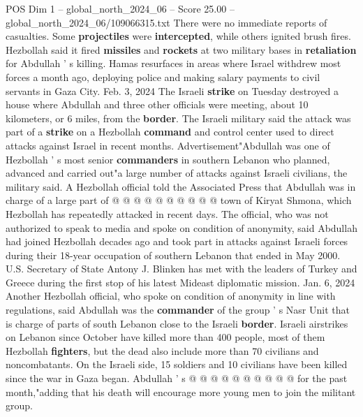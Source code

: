 \begin{textsample}{POS Dim 1 – global\_north\_2024\_06 – Score 25.00 – global\_north\_2024\_06/109066315.txt}
There were no immediate reports of casualties.
Some \textbf{projectiles} were \textbf{intercepted}, while others ignited brush fires.
Hezbollah said it fired \textbf{missiles} and \textbf{rockets} at two military bases in \textbf{retaliation} for Abdullah ' s killing.
Hamas resurfaces in areas where Israel withdrew most forces a month ago, deploying police and making salary payments to civil servants in Gaza City.
Feb. 3, 2024 The Israeli \textbf{strike} on Tuesday destroyed a house where Abdullah and three other officials were meeting, about 10 kilometers, or 6 miles, from the \textbf{border}.
The Israeli military said the attack was part of a \textbf{strike} on a Hezbollah \textbf{command} and control center used to direct attacks against Israel in recent months.
Advertisement"Abdullah was one of Hezbollah ' s most senior \textbf{commanders} in southern Lebanon who planned, advanced and carried out"a large number of attacks against Israeli civilians, the military said.
A Hezbollah official told the Associated Press that Abdullah was in charge of a large part of @ @ @ @ @ @ @ @ @ @ town of Kiryat Shmona, which Hezbollah has repeatedly attacked in recent days.
The official, who was not authorized to speak to media and spoke on condition of anonymity, said Abdullah had joined Hezbollah decades ago and took part in attacks against Israeli forces during their 18-year occupation of southern Lebanon that ended in May 2000.
U.S.
Secretary of State Antony J.
Blinken has met with the leaders of Turkey and Greece during the first stop of his latest Mideast diplomatic mission.
Jan. 6, 2024 Another Hezbollah official, who spoke on condition of anonymity in line with regulations, said Abdullah was the \textbf{commander} of the group ' s Nasr Unit that is charge of parts of south Lebanon close to the Israeli \textbf{border}.
Israeli airstrikes on Lebanon since October have killed more than 400 people, most of them Hezbollah \textbf{fighters}, but the dead also include more than 70 civilians and noncombatants.
On the Israeli side, 15 soldiers and 10 civilians have been killed since the war in Gaza began.
Abdullah ' s @ @ @ @ @ @ @ @ @ @ for the past month,"adding that his death will encourage more young men to join the militant group.

\end{textsample}
